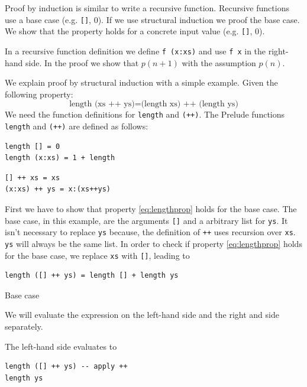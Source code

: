 Proof by induction is similar to write a recursive function. Recursive functions use a base case (e.g. \verb|[]|, 0). 
If we use structural induction we proof the base case. We show that the property holds for a concrete input value (e.g. \verb|[]|, 0). 

In a recursive function definition we define \verb|f (x:xs)| and use \verb|f x| in the right-hand side. In the proof we show that $p(n+1)$ with the assumption $p(n)$.

We explain proof by structural induction with a simple example. Given the following property:
\begin{equation}
  \label{eq:lengthprop}
  \text{length (xs ++ ys)} = \text{(length xs) ++ (length ys)}
\end{equation}
We need the function definitions for \verb|length| and \verb|(++)|.
The Prelude functions \verb|length| and \verb|(++)| are defined as follows:
\begin{verbatim}
length [] = 0
length (x:xs) = 1 + length 
\end{verbatim}

\begin{verbatim}
[] ++ xs = xs
(x:xs) ++ ys = x:(xs++ys)
\end{verbatim}

First we have to show that property \ref{eq:lengthprop} holds for the base case. The base case, in this example, are the arguments \verb|[]| and a arbitrary list for \verb|ys|. It isn't necessary to replace \verb|ys| because, the definition of \verb|++| uses recursion over \verb|xs|. \verb|ys| will always be the same list.
In order to check if property \ref{eq:lengthprop} holds for the base case, we replace \verb|xs| with  \verb|[]|, leading to

\begin{program}
\begin{verbatim}
length ([] ++ ys) = length [] + length ys
\end{verbatim}
\caption{Base case}
\label{lst:equality1}
\end{program}

We will evaluate the expression on the left-hand side and the right and side separately.

The left-hand side evaluates to
\begin{program}
\begin{verbatim}
length ([] ++ ys) -- apply ++
length ys
\end{verbatim}
\end{program}

